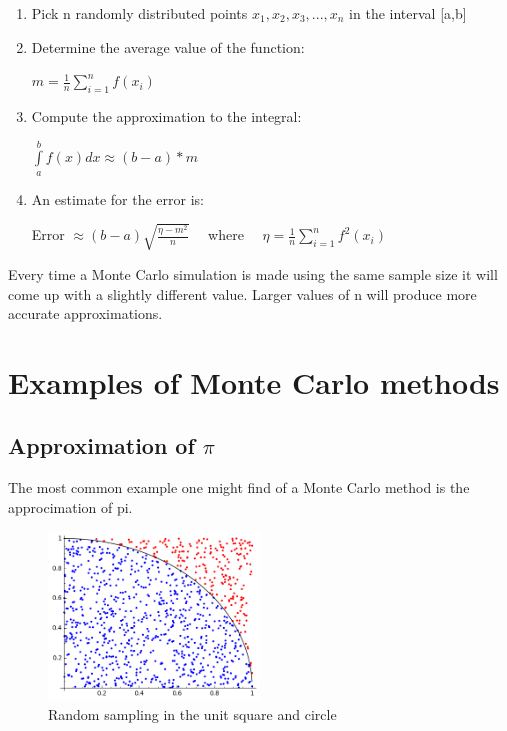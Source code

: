 \documentclass{article}
\begin{document}
\begin{enumerate}
\item Pick n randomly distributed points $x_1, x_2, x_3, . . . , x_n$ in the interval [a,b]
\item Determine the average value of the function: \\

\centerline{$m = \frac{1}{n} \sum\limits_{i=1}^n f(x_i)$}

\item  Compute the approximation to the integral: \\

\centerline{$\int\limits_{a}^b f(x) dx \approx (b - a) * m$}

\item An estimate for the error is: \\

\centerline{Error $\approx (b - a) \sqrt{\frac{\eta - m^2}{n}} \quad$ where $\quad \eta = \frac{1}{n} \sum\limits_{i=1}^n f^2(x_i)$}
\end{enumerate}

\noindent Every time a Monte Carlo simulation is made using the same sample size it will come up with a slightly different value. Larger values of n will produce more accurate approximations.

\pagebreak

\section{Examples of Monte Carlo methods}

\subsection{Approximation of $\pi$}

\hspace{4ex} The most common example one might find of a Monte Carlo method is the approcimation of pi.

\begin{figure}
  \vspace{-20pt}
  \begin{center}
    \includegraphics[width=0.5\textwidth]{monte1}
  \end{center}
  \caption{Random sampling in the unit square and circle}
  \vspace{-35pt}
  \vspace{30pt}
\end{figure}
\end{document}
